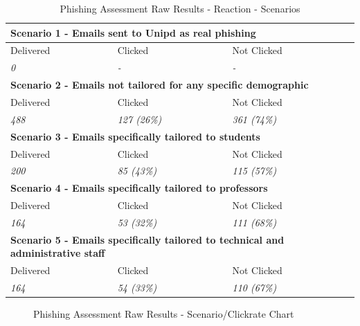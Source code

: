 \documentclass[a4paper]{article}
\begin{document}
\begingroup
\renewcommand{\arraystretch}{1.25}
\begin{table}[ht]
\begin{center}
    \begin{tabular}{ | m{12.3em} | m{12.3em} | m{12.3em} | }
    \hline
    \multicolumn{3}{|l|}{\textbf{Scenario 1 - Emails sent to Unipd as real phishing}} \\
    \hline
    Delivered & Clicked & Not Clicked \\
    \hline
    \textit{0} & \textit{-} & \textit{-} \\
    \hline
    \multicolumn{3}{|l|}{\textbf{Scenario 2 - Emails not tailored for any specific demographic}} \\
    \hline
    Delivered & Clicked & Not Clicked \\
    \hline
    \textit{488} & \textit{127 (26\%)} & \textit{361 (74\%)} \\
    \hline
    \multicolumn{3}{|l|}{\textbf{Scenario 3 - Emails specifically tailored to students}} \\
    \hline
    Delivered & Clicked & Not Clicked \\
    \hline
    \textit{200} & \textit{85 (43\%)} & \textit{115 (57\%)} \\
    \hline
    \multicolumn{3}{|l|}{\textbf{Scenario 4 - Emails specifically tailored to professors}} \\
    \hline
    Delivered & Clicked & Not Clicked \\
    \hline
    \textit{164} & \textit{53 (32\%)} & \textit{111 (68\%)} \\
    \hline
    \multicolumn{3}{|l|}{\textbf{Scenario 5 - Emails specifically tailored to technical and administrative staff}} \\
    \hline
    Delivered & Clicked & Not Clicked \\
    \hline
    \textit{164} & \textit{54 (33\%)} & \textit{110 (67\%)} \\
    \hline
    \end{tabular}
\end{center}
\caption{Phishing Assessment Raw Results - Reaction - Scenarios}
\label{t-varreact0-scen}
\end{table}

\vspace{5mm}

\begin{figure}[H]
	\centering
	\caption{Phishing Assessment Raw Results - Scenario/Clickrate Chart}
	\label{chart-scen}
\end{figure}
\end{document}
